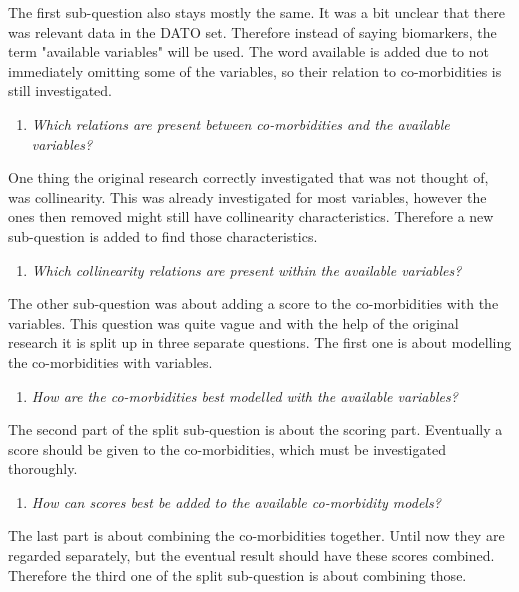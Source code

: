 \documentclass[10pt,a4paper]{article}
\begin{document}
	The first sub-question also stays mostly the same. It was a bit unclear that there was relevant data in the DATO set. Therefore instead of saying biomarkers, the term "available variables" will be used. The word available is added due to not immediately omitting some of the variables, so their relation to co-morbidities is still investigated.
	
	\begin{enumerate}
		\item \emph{Which relations are present between co-morbidities and the available variables?}
	\end{enumerate}
	
	One thing the original research correctly investigated that was not thought of, was collinearity. This was already investigated for most variables, however the ones then removed might still have collinearity characteristics. Therefore a new sub-question is added to find those characteristics.
	
	\begin{enumerate}[resume]
		\item \emph{Which collinearity relations are present within the available variables?}
	\end{enumerate}
		
	The other sub-question was about adding a score to the co-morbidities with the variables. This question was quite vague and with the help of the original research it is split up in three separate questions. The first one is about modelling the co-morbidities with variables.
	
	\begin{enumerate}[resume]
		\item \emph{How are the co-morbidities best modelled with the available variables?}
	\end{enumerate}
	
	The second part of the split sub-question is about the scoring part. Eventually a score should be given to the co-morbidities, which  must be investigated thoroughly.
	
	\begin{enumerate}[resume]
		\item \emph{How can scores best be added to the available co-morbidity models?}
	\end{enumerate}
	
	The last part is about combining the co-morbidities together. Until now they are regarded separately, but the eventual result should have these scores combined. Therefore the third one of the split sub-question is about combining those.
	
\end{document}
